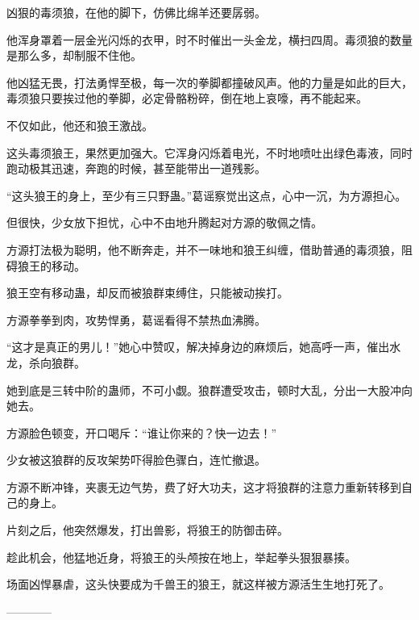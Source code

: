 \begin{this_body}
凶狠的毒须狼，在他的脚下，仿佛比绵羊还要孱弱。

他浑身罩着一层金光闪烁的衣甲，时不时催出一头金龙，横扫四周。毒须狼的数量是那么多，却制服不住他。

他凶猛无畏，打法勇悍至极，每一次的拳脚都撞破风声。他的力量是如此的巨大，毒须狼只要挨过他的拳脚，必定骨骼粉碎，倒在地上哀嚎，再不能起来。

不仅如此，他还和狼王激战。

这头毒须狼王，果然更加强大。它浑身闪烁着电光，不时地喷吐出绿色毒液，同时跑动极其迅速，奔跑的时候，甚至能带出一道残影。

“这头狼王的身上，至少有三只野蛊。”葛谣察觉出这点，心中一沉，为方源担心。

但很快，少女放下担忧，心中不由地升腾起对方源的敬佩之情。

方源打法极为聪明，他不断奔走，并不一味地和狼王纠缠，借助普通的毒须狼，阻碍狼王的移动。

狼王空有移动蛊，却反而被狼群束缚住，只能被动挨打。

方源拳拳到肉，攻势悍勇，葛谣看得不禁热血沸腾。

“这才是真正的男儿！”她心中赞叹，解决掉身边的麻烦后，她高呼一声，催出水龙，杀向狼群。

她到底是三转中阶的蛊师，不可小觑。狼群遭受攻击，顿时大乱，分出一大股冲向她去。

方源脸色顿变，开口喝斥：“谁让你来的？快一边去！”

少女被这狼群的反攻架势吓得脸色骤白，连忙撤退。

方源不断冲锋，夹裹无边气势，费了好大功夫，这才将狼群的注意力重新转移到自己的身上。

片刻之后，他突然爆发，打出兽影，将狼王的防御击碎。

趁此机会，他猛地近身，将狼王的头颅按在地上，举起拳头狠狠暴揍。

场面凶悍暴虐，这头快要成为千兽王的狼王，就这样被方源活生生地打死了。

------------

\end{this_body}

